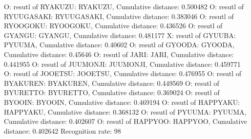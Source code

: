 O: resutl of RYAKUZU: RYAKUZU, Cumulative distance: 0.500482
O: resutl of RYUUGASAKI: RYUUGASAKI, Cumulative distance: 0.383046
O: resutl of RYOOGOKU: RYOOGOKU, Cumulative distance: 0.436526
O: resutl of GYANGU: GYANGU, Cumulative distance: 0.481177
X: resutl of GYUUBA: PYUUMA, Cumulative distance: 0.40602
O: resutl of GYOODA: GYOODA, Cumulative distance: 0.45646
O: resutl of JARI: JARI, Cumulative distance: 0.441955
O: resutl of JUUMONJI: JUUMONJI, Cumulative distance: 0.459771
O: resutl of JOOETSU: JOOETSU, Cumulative distance: 0.476955
O: resutl of BYAKUREN: BYAKUREN, Cumulative distance: 0.449569
O: resutl of BYURETTO: BYURETTO, Cumulative distance: 0.369024
O: resutl of BYOOIN: BYOOIN, Cumulative distance: 0.469194
O: resutl of HAPPYAKU: HAPPYAKU, Cumulative distance: 0.368132
O: resutl of PYUUMA: PYUUMA, Cumulative distance: 0.402607
O: resutl of HAPPYOO: HAPPYOO, Cumulative distance: 0.402642
Recognition rate: 98%
